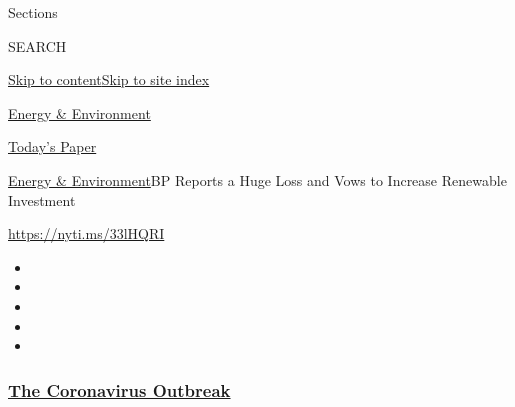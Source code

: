Sections

SEARCH

\protect\hyperlink{site-content}{Skip to
content}\protect\hyperlink{site-index}{Skip to site index}

\href{https://www.nytimes3xbfgragh.onion/section/business/energy-environment}{Energy
\& Environment}

\href{https://myaccount.nytimes3xbfgragh.onion/auth/login?response_type=cookie\&client_id=vi}{}

\href{https://www.nytimes3xbfgragh.onion/section/todayspaper}{Today's
Paper}

\href{/section/business/energy-environment}{Energy \&
Environment}\textbar{}BP Reports a Huge Loss and Vows to Increase
Renewable Investment

\url{https://nyti.ms/33lHQRI}

\begin{itemize}
\item
\item
\item
\item
\item
\end{itemize}

\hypertarget{the-coronavirus-outbreak}{%
\subsubsection{\texorpdfstring{\href{https://www.nytimes3xbfgragh.onion/news-event/coronavirus?name=styln-coronavirus-markets\&region=TOP_BANNER\&variant=undefined\&block=storyline_menu_recirc\&action=click\&pgtype=Article\&impression_id=4986d080-e38c-11ea-ba56-c354277706d3}{The
Coronavirus
Outbreak}}{The Coronavirus Outbreak}}\label{the-coronavirus-outbreak}}

